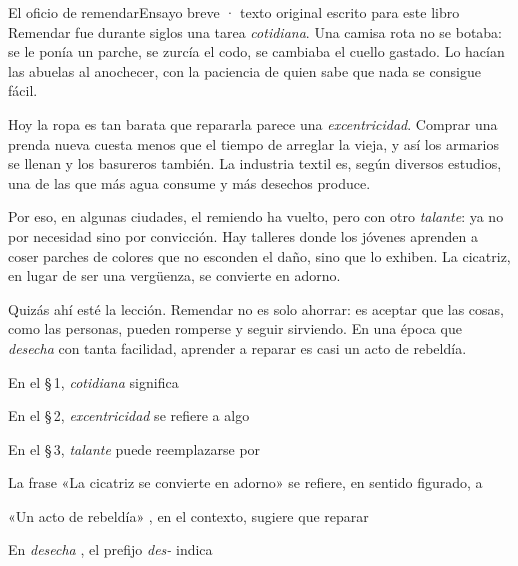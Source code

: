 \evaluacion
\begin{texto}{El oficio de remendar}{Ensayo breve · texto original escrito para este libro}
\pa Remendar fue durante siglos una tarea \emph{cotidiana}. Una camisa rota no se botaba: se le ponía un parche, se zurcía
el codo, se cambiaba el cuello gastado. Lo hacían las abuelas al anochecer, con la paciencia de quien sabe que nada se
consigue fácil.

\pa Hoy la ropa es tan barata que repararla parece una \emph{excentricidad}. Comprar una prenda nueva cuesta menos que el
tiempo de arreglar la vieja, y así los armarios se llenan y los basureros también. La industria textil es, según diversos
estudios, una de las que más agua consume y más desechos produce.

\pa Por eso, en algunas ciudades, el remiendo ha vuelto, pero con otro \emph{talante}: ya no por necesidad sino por
convicción. Hay talleres donde los jóvenes aprenden a coser parches de colores que no esconden el daño, sino que lo
exhiben. La cicatriz, en lugar de ser una vergüenza, se convierte en adorno.

\pa Quizás ahí esté la lección. Remendar no es solo ahorrar: es aceptar que las cosas, como las personas, pueden romperse
y seguir sirviendo. En una época que \emph{desecha} con tanta facilidad, aprender a reparar es casi un acto de rebeldía.
\end{texto}
\begin{ejercicios}
\item En el \S\,1, \emph{cotidiana} significa
\item En el \S\,2, \emph{excentricidad} se refiere a algo
\item En el \S\,3, \emph{talante} puede reemplazarse por
\item La frase «La cicatriz se convierte en adorno»  se refiere, en sentido figurado, a
\item «Un acto de rebeldía» , en el contexto, sugiere que reparar
\item En \emph{desecha} , el prefijo \emph{des-} indica
\end{ejercicios}

